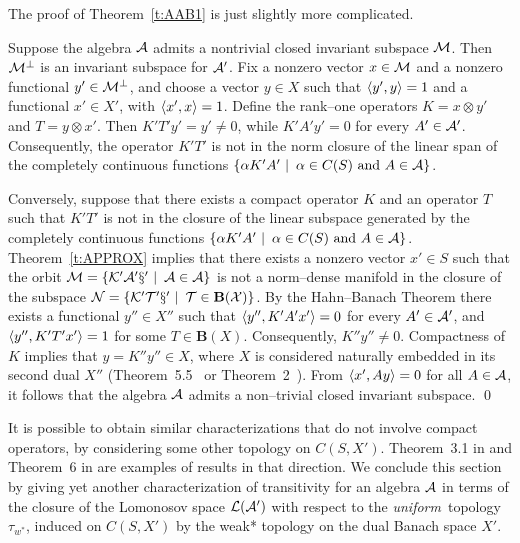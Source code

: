\bigskip

The proof of Theorem~\ref{t:AAB1} is just slightly more complicated.

\medskip

Suppose the algebra ${\cal A}$ admits a nontrivial closed invariant subspace $\cal
M$. Then $\cal M^\perp$ is an invariant subspace for ${\cal A}'$. Fix a nonzero
vector $x \in \cal M$ and a nonzero functional $y'\in\cal{}M^\perp$, and
choose a vector $y \in X$ such that $\left<y',y\right>=1$ and a functional $x'\in
X'$, with $\left<x',x\right>=1$. Define the rank--one operators $K=x\otimes y'$ and
$T=y \otimes x'$. Then $K'T'y'=y'\neq0$, while $K' A' y' = 0$ for every $A'
\in {\cal A}'$. Consequently, the operator $K'T'$ is not in the norm closure of the
linear span of the completely continuous functions $\left\{ \alpha K' A'
\,\,|\,\,\, \alpha \in C(S) \text{ and } A \in {\cal A}\right\}$.

\smallskip

Conversely, suppose that there exists a compact operator $K$ and an operator
$T$ such that $K'T'$ is not in the closure of the linear subspace generated
by the completely continuous functions $\left\{ \alpha K' A' \,\,|\,\,\, \alpha
\in C(S) \text{ and } A \in {\cal A}\right\}$. Theorem~\ref{t:APPROX} implies that there
exists a nonzero vector $x'\in{}S$ such that the orbit
$\cal{M}=\left\{K'A'x'\,\,|\,\,\, A\in{\cal A}\right\}$ is not a norm--dense manifold in the
closure of the subspace $\cal{N}=\left\{K'T'x'\,\,|\,\,\, T\in\mathbf{B}(X)\right\}$.
By the Hahn--Banach Theorem there exists a functional $y''\in X''$ such that
$\left<y'',K'A'x'\right>=0$ for every $A'\in{\cal A}'$, and $\left<y'',K'T'x'\right>=1$ for some
$T \in \mathbf{B}(X)$. Consequently, $K''y''\neq0$. Compactness of $K$
implies that $y=K''y''\in X$, where $X$ is considered naturally embedded in
its second dual $X''$ (Theorem~5.5~\cite[p.\,185]{Con90} or
Theorem~2~\cite[p.\,482]{DS57}). From $\left<x',A{}y\right>=0$ for all $A\in{\cal A}$, it
follows that the algebra ${\cal A}$ admits a non--trivial closed invariant
subspace. \qed

\medskip

It is possible to obtain similar characterizations that do not involve
compact operators, by considering some other topology on $C(S,X')$.
Theorem~3.1 in \cite{AAB95} and Theorem~6 in \cite{dB93} are examples of
results in that direction. We conclude this section by giving yet another
characterization of transitivity for an algebra ${\cal A}$ in terms of the closure
of the Lomonosov space $\cal{L}({\cal A}')$ with respect to the {\em uniform}\,
topology $\tau_{w^*}$, induced on $C(S,X')$ by the weak* topology on the dual
Banach space $X'$.


